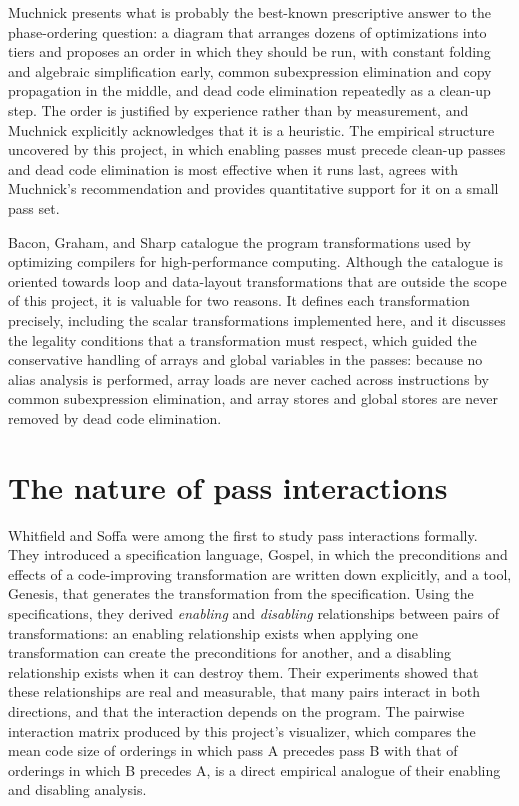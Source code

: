 Muchnick \cite{muchnick1997} presents what is probably the best-known prescriptive answer to the phase-ordering question: a diagram that arranges dozens of optimizations into tiers and proposes an order in which they should be run, with constant folding and algebraic simplification early, common subexpression elimination and copy propagation in the middle, and dead code elimination repeatedly as a clean-up step. The order is justified by experience rather than by measurement, and Muchnick explicitly acknowledges that it is a heuristic. The empirical structure uncovered by this project, in which enabling passes must precede clean-up passes and dead code elimination is most effective when it runs last, agrees with Muchnick's recommendation and provides quantitative support for it on a small pass set.

Bacon, Graham, and Sharp \cite{bacon1994} catalogue the program transformations used by optimizing compilers for high-performance computing. Although the catalogue is oriented towards loop and data-layout transformations that are outside the scope of this project, it is valuable for two reasons. It defines each transformation precisely, including the scalar transformations implemented here, and it discusses the legality conditions that a transformation must respect, which guided the conservative handling of arrays and global variables in the passes: because no alias analysis is performed, array loads are never cached across instructions by common subexpression elimination, and array stores and global stores are never removed by dead code elimination.

\section*{The nature of pass interactions}

Whitfield and Soffa \cite{whitfield1997} were among the first to study pass interactions formally. They introduced a specification language, Gospel, in which the preconditions and effects of a code-improving transformation are written down explicitly, and a tool, Genesis, that generates the transformation from the specification. Using the specifications, they derived \emph{enabling} and \emph{disabling} relationships between pairs of transformations: an enabling relationship exists when applying one transformation can create the preconditions for another, and a disabling relationship exists when it can destroy them. Their experiments showed that these relationships are real and measurable, that many pairs interact in both directions, and that the interaction depends on the program. The pairwise interaction matrix produced by this project's visualizer, which compares the mean code size of orderings in which pass A precedes pass B with that of orderings in which B precedes A, is a direct empirical analogue of their enabling and disabling analysis.


